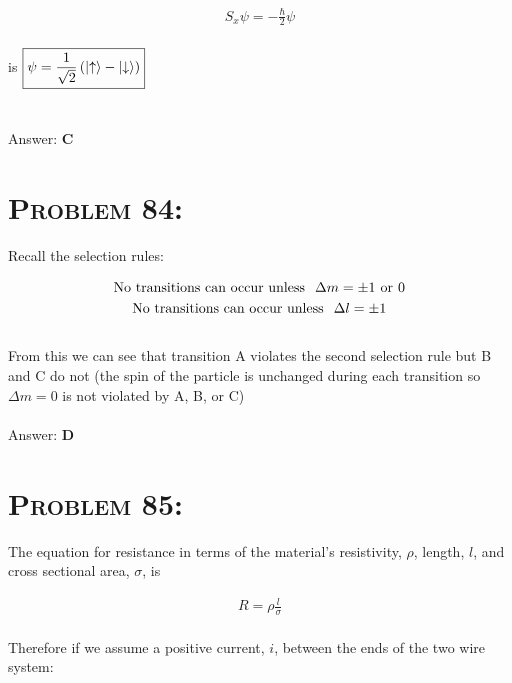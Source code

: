\documentclass{article}
\begin{document}
\begin{gather}
S_{x} \psi = -\frac{\hbar}{2} \psi\nonumber
\end{gather}
\\
is $\boxed{\psi = \frac{1}{\sqrt{2}}\left(  \ket{\uparrow}   - \ket{\downarrow}  \right)}$\\
\\\\
Answer: \textbf{\textcolor{ProcessBlue}C}\\


\section{\textsc{Problem 84:}} Recall the selection rules:

\begin{gather}
\text{No transitions can occur unless} \hspace{.1in} \Delta m = \pm 1 \hspace{.05in} \text{or} \hspace{.05in} 0 \\
\text{No transitions can occur unless} \hspace{.1in} \Delta l = \pm 1
\end{gather}
\\
From this we can see that transition A violates the second selection rule but B and C do not (the spin of the particle is unchanged during each transition so $\Delta m = 0$ is not violated by A, B, or C)
\\\\
Answer: \textbf{\textcolor{ProcessBlue}D}\\


\section{\textsc{Problem 85:}} The equation for resistance in terms of the material's resistivity, $\rho$, length, $l$, and cross sectional area, $\sigma$, is

\begin{gather}
R = \rho \frac{l}{\sigma}
\end{gather}
\\
Therefore if we assume a positive current, $i$, between the ends of the two wire system:
\end{document}
